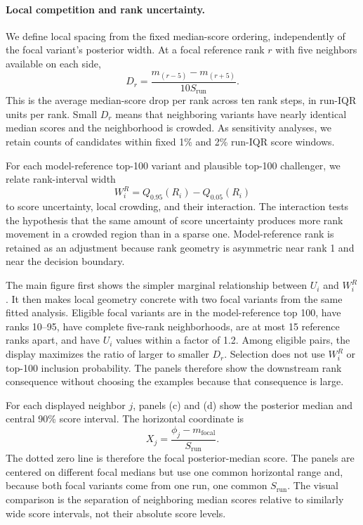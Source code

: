 \documentclass[11pt]{article}
\newcommand{\fit}{\phi}
\begin{document}
\paragraph{Local competition and rank uncertainty.}
We define local spacing from the fixed median-score ordering, independently of the focal variant's posterior width. At a focal reference rank $r$ with five neighbors available on each side,
\[
D_r=\frac{m_{(r-5)}-m_{(r+5)}}{10S_{\mathrm{run}}}.
\]
This is the average median-score drop per rank across ten rank steps, in run-IQR units per rank. Small $D_r$ means that neighboring variants have nearly identical median scores and the neighborhood is crowded. As sensitivity analyses, we retain counts of candidates within fixed 1\% and 2\% run-IQR score windows.

For each model-reference top-100 variant and plausible top-100 challenger, we relate rank-interval width
\[
W_i^R = Q_{0.95}(R_i)-Q_{0.05}(R_i)
\]
to score uncertainty, local crowding, and their interaction. The interaction tests the hypothesis that the same amount of score uncertainty produces more rank movement in a crowded region than in a sparse one. Model-reference rank is retained as an adjustment because rank geometry is asymmetric near rank 1 and near the decision boundary.

The main figure first shows the simpler marginal relationship between $U_i$ and $W_i^R$. It then makes local geometry concrete with two focal variants from the same fitted analysis. Eligible focal variants are in the model-reference top 100, have ranks 10--95, have complete five-rank neighborhoods, are at most 15 reference ranks apart, and have $U_i$ values within a factor of 1.2. Among eligible pairs, the display maximizes the ratio of larger to smaller $D_r$. Selection does not use $W_i^R$ or top-100 inclusion probability. The panels therefore show the downstream rank consequence without choosing the examples because that consequence is large.

For each displayed neighbor $j$, panels (c) and (d) show the posterior median and central 90\% score interval. The horizontal coordinate is
\[
X_j=\frac{\fit_j-m_{\mathrm{focal}}}{S_{\mathrm{run}}}.
\]
The dotted zero line is therefore the focal posterior-median score. The panels are centered on different focal medians but use one common horizontal range and, because both focal variants come from one run, one common $S_{\mathrm{run}}$. The visual comparison is the separation of neighboring median scores relative to similarly wide score intervals, not their absolute score levels.
\end{document}
